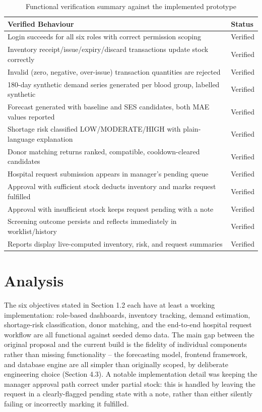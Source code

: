 \documentclass[12pt,twoside]{report}
\begin{document}
\begin{table}[htbp]
\centering
\begin{tabular}{p{10.5cm} l}
\toprule
\textbf{Verified Behaviour} & \textbf{Status} \\
\midrule
Login succeeds for all six roles with correct permission scoping & Verified \\
Inventory receipt/issue/expiry/discard transactions update stock correctly & Verified \\
Invalid (zero, negative, over-issue) transaction quantities are rejected & Verified \\
180-day synthetic demand series generated per blood group, labelled synthetic & Verified \\
Forecast generated with baseline and SES candidates, both MAE values reported & Verified \\
Shortage risk classified LOW/MODERATE/HIGH with plain-language explanation & Verified \\
Donor matching returns ranked, compatible, cooldown-cleared candidates & Verified \\
Hospital request submission appears in manager's pending queue & Verified \\
Approval with sufficient stock deducts inventory and marks request fulfilled & Verified \\
Approval with insufficient stock keeps request pending with a note & Verified \\
Screening outcome persists and reflects immediately in worklist/history & Verified \\
Reports display live-computed inventory, risk, and request summaries & Verified \\
\bottomrule
\end{tabular}
\caption{Functional verification summary against the implemented prototype}
\end{table}

\section{Analysis}

The six objectives stated in Section 1.2 each have at least a working implementation: role-based dashboards, inventory tracking, demand estimation, shortage-risk classification, donor matching, and the end-to-end hospital request workflow are all functional against seeded demo data. The main gap between the original proposal and the current build is the fidelity of individual components rather than missing functionality -- the forecasting model, frontend framework, and database engine are all simpler than originally scoped, by deliberate engineering choice (Section 4.3). A notable implementation detail was keeping the manager approval path correct under partial stock: this is handled by leaving the request in a clearly-flagged pending state with a note, rather than either silently failing or incorrectly marking it fulfilled.
\end{document}

